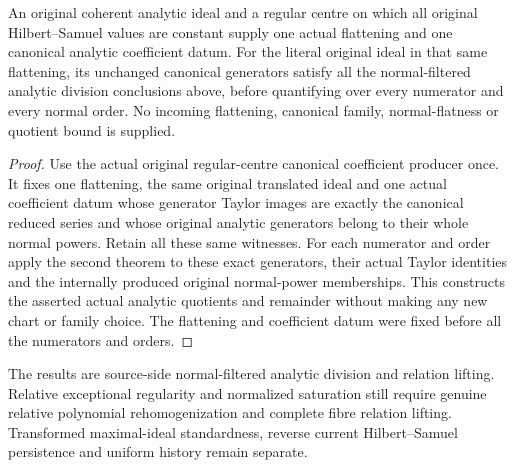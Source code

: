 \begin{corollary}
\label{hir:actual-original-hs-centre-normal-filtered-owner-division}
\leanok
An original coherent analytic ideal and a regular centre on which all
original Hilbert--Samuel values are constant supply one actual flattening
and one canonical analytic coefficient datum. For the literal original
ideal in that same flattening, its unchanged canonical generators satisfy
all the normal-filtered analytic division conclusions above, before
quantifying over every numerator and every normal order. No incoming
flattening, canonical family, normal-flatness or quotient bound is supplied.
\end{corollary}
\begin{proof}
Use the actual original regular-centre canonical coefficient producer
once. It fixes one flattening, the same original translated ideal and
one actual coefficient datum whose generator Taylor images are exactly
the canonical reduced series and whose original analytic generators
belong to their whole normal powers. Retain all these same witnesses.
For each numerator and order apply the second theorem to these exact
generators, their actual Taylor identities and the internally produced
original normal-power memberships. This constructs the asserted actual
analytic quotients and remainder without making any new chart or
family choice. The flattening and coefficient datum were fixed before
all the numerators and orders.
\end{proof}

The results are source-side normal-filtered analytic division and relation
lifting. Relative exceptional regularity and normalized saturation still
require genuine relative polynomial rehomogenization and complete fibre
relation lifting. Transformed maximal-ideal standardness, reverse current
Hilbert--Samuel persistence and uniform history remain separate.
